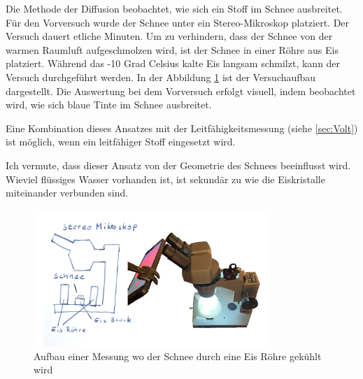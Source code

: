 Die Methode der Diffusion beobachtet, wie sich ein Stoff im Schnee ausbreitet. Für den Vorversuch wurde der Schnee unter ein Stereo-Mikroskop platziert. Der Versuch dauert etliche Minuten. Um zu verhindern, dass der Schnee von der warmen Raumluft aufgeschmolzen wird, ist der Schnee in einer Röhre aus Eis platziert. Während das -10 Grad Celsius kalte Eis langsam schmilzt, kann der Versuch durchgeführt werden. In der Abbildung \ref{fig:AutMess} ist der Versuchaufbau dargestellt. Die Auswertung bei dem Vorversuch erfolgt visuell, indem beobachtet wird, wie sich blaue Tinte im Schnee ausbreitet.

Eine Kombination dieses Ansatzes mit der Leitfähigkeitsmessung (siehe \ref{sec:Volt}) ist möglich, wenn ein leitfähiger Stoff eingesetzt wird.

Ich vermute, dass dieser Ansatz von der Geometrie des Schnees beeinflusst wird. Wieviel flüssiges Wasser vorhanden ist, ist sekundär zu wie die Eiskristalle miteinander verbunden sind.

\begin{figure}[H]
    \centering
    \includegraphics[width=0.8\textwidth]{Bilder/freistellen.jpeg}
    \caption{Aufbau einer Messung wo der Schnee durch eine Eis Röhre gekühlt wird}
    \label{fig:AutMess}
\end{figure}
